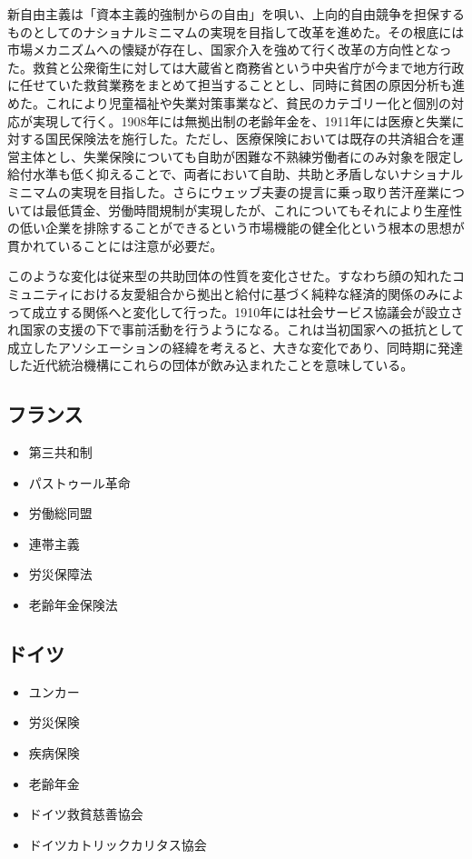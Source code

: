 \documentclass{jsarticle}
\begin{document}
新自由主義は「資本主義的強制からの自由」を唄い、上向的自由競争を担保するものとしてのナショナルミニマムの実現を目指して改革を進めた。その根底には市場メカニズムへの懐疑が存在し、国家介入を強めて行く改革の方向性となった。救貧と公衆衛生に対しては大蔵省と商務省という中央省庁が今まで地方行政に任せていた救貧業務をまとめて担当することとし、同時に貧困の原因分析も進めた。これにより児童福祉や失業対策事業など、貧民のカテゴリー化と個別の対応が実現して行く。1908年には無拠出制の老齢年金を、1911年には医療と失業に対する国民保険法を施行した。ただし、医療保険においては既存の共済組合を運営主体とし、失業保険についても自助が困難な不熟練労働者にのみ対象を限定し給付水準も低く抑えることで、両者において自助、共助と矛盾しないナショナルミニマムの実現を目指した。さらにウェッブ夫妻の提言に乗っ取り苦汗産業については最低賃金、労働時間規制が実現したが、これについてもそれにより生産性の低い企業を排除することができるという市場機能の健全化という根本の思想が貫かれていることには注意が必要だ。

このような変化は従来型の共助団体の性質を変化させた。すなわち顔の知れたコミュニティにおける友愛組合から拠出と給付に基づく純粋な経済的関係のみによって成立する関係へと変化して行った。1910年には社会サービス協議会が設立され国家の支援の下で事前活動を行うようになる。これは当初国家への抵抗として成立したアソシエーションの経緯を考えると、大きな変化であり、同時期に発達した近代統治機構にこれらの団体が飲み込まれたことを意味している。

\subsection{フランス}
\begin{itemize}
	\item 第三共和制
	\item パストゥール革命
	\item 労働総同盟
	\item 連帯主義
	\item 労災保障法
	\item 老齢年金保険法
\end{itemize}

\subsection{ドイツ}
\begin{itemize}
	\item ユンカー
	\item 労災保険
	\item 疾病保険
	\item 老齢年金
	\item ドイツ救貧慈善協会
	\item ドイツカトリックカリタス協会
\end{itemize}
\end{document}
